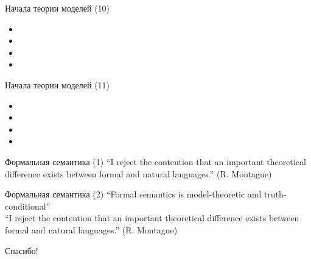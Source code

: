 \documentclass{beamer}
\begin{document}
\begin{frame}{Начала теории моделей (10)}
  \begin{itemize}
    \item 
    \item 
    \item 
    \item 
  \end{itemize}
\end{frame}

\begin{frame}{Начала теории моделей (11)}
  \begin{itemize}
    \item 
    \item 
    \item 
    \item 
  \end{itemize}
\end{frame}


\begin{frame}{Формальная семантика (1)}
``I reject the contention that an important theoretical difference exists between formal and natural languages.'' (R. Montague) 
\end{frame}

\begin{frame}{Формальная семантика (2)}
``Formal semantics is model-theoretic and truth-conditional''\\
\bigskip
``I reject the contention that an important theoretical difference exists between formal and natural languages.'' (R. Montague) 
\end{frame}


\begin{frame}{}
    \thispagestyle{empty}
    \begin{center}
        {\large Спасибо!}
    \end{center}
\end{frame}


\end{document}
